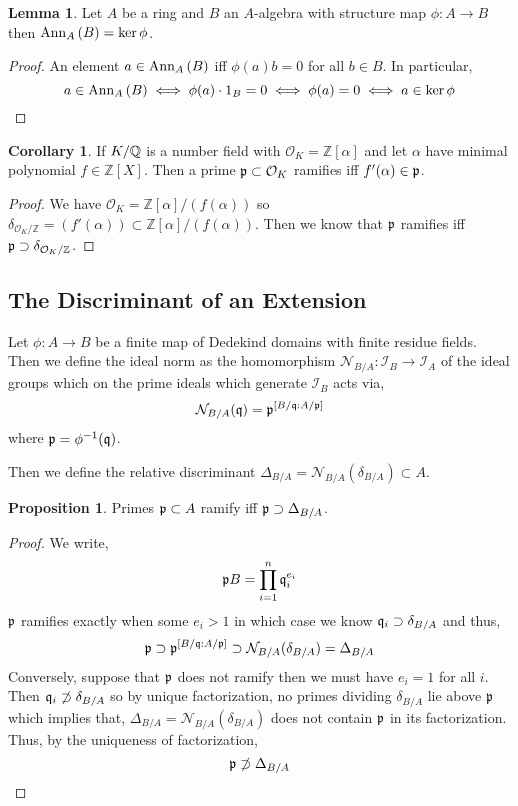 \documentclass[12pt]{extarticle}
\newcommand{\Z}{\mathbb{Z}}
\theoremstyle{definition}
\newtheorem{lemma}[theorem]{Lemma}
\newtheorem{proposition}[theorem]{Proposition}
\newtheorem{corollary}[theorem]{Corollary}
\newenvironment{definition}[1][Definition:]{\begin{trivlist}
\item[\hskip \labelsep {\bfseries #1}]}{\end{trivlist}}
\begin{document}
\begin{lemma}
Let $A$ be a ring and $B$ an $A$-algebra with structure map $\phi : A \to B$ then $\mathrm{Ann}_{A}\left( B \right) = \ker{\phi}$. 
\end{lemma}

\begin{proof}
An element $a \in \mathrm{Ann}_{A}\left( B \right)$ iff $\phi(a)b = 0$ for all $b \in B$. In particular,
\[ a \in \mathrm{Ann}_{A}\left( B \right) \iff \phi(a) \cdot 1_B = 0 \iff \phi(a) = 0 \iff a \in \ker{\phi} \]
\end{proof}
\newcommand{\ints}[1]{\mathcal{O}_{#1}}

\begin{corollary}
If $K / \mathbb{Q}$ is a number field with $\ints{K} = \Z[\alpha]$ and let $\alpha$ have minimal polynomial $f \in \Z[X]$. Then a prime $\p \subset \ints{K}$ ramifies iff $f'(\alpha) \in \mathfrak{p}$. 
\end{corollary}

\begin{proof}
We have $\ints{K} = \Z[\alpha]/(f(\alpha))$ so $\delta_{\ints{K}/\Z} = (f'(\alpha)) \subset \Z[\alpha]/(f(\alpha))$. Then we know that $\mathfrak{p}$ ramifies iff $\p \supset \delta_{\ints{K}/\Z}$. 
\end{proof}

\subsection{The Discriminant of an Extension}

\newcommand{\Norm}{\mathcal{N}}
\newcommand{\I}{\mathcal{I}}

\begin{definition}
Let $\phi : A \to B$ be a finite map of Dedekind domains with finite residue fields. Then we define the ideal norm as the homomorphism $\Norm_{B/A} : \I_{B} \to \I_{A}$ of the ideal groups which on the prime ideals which generate $\I_B$ acts via,
\[ \Norm_{B / A}(\q) = \p^{[B / \q : A / \p]} \]
where $\mathfrak{p} = \phi^{-1}(\mathfrak{q})$. 
\end{definition}


\begin{definition}
Then we define the relative discriminant $\Delta_{B/A} = \Norm_{B/A}(\delta_{B/A}) \subset A$.
\end{definition}

\begin{proposition}
Primes $\mathfrak{p} \subset A$ ramify iff $\mathfrak{p} \supset \Delta_{B / A}$. 
\end{proposition}

\begin{proof}
We write,
\[ \mathfrak{p} B = \prod_{i = 1}^n \mathfrak{q}_i^{e_i} \]
$\mathfrak{p}$ ramifies exactly when some $e_i > 1$ in which case we know $\mathfrak{q}_i \supset \delta_{B/A}$ and thus,
\[ \p \supset \p^{[B / \q : A / \p]} \supset \Norm_{B / A}(\delta_{B/A}) = \Delta_{B/A} \]
Conversely, suppose that $\mathfrak{p}$ does not ramify then we must have $e_i = 1$ for all $i$. Then $\mathfrak{q}_i \not\supset \delta_{B/A}$ so by unique factorization, no primes dividing $\delta_{B/A}$ lie above $\mathfrak{p}$ which implies that, $\Delta_{B/A} = \Norm_{B/A}(\delta_{B/A})$ does not contain $\mathfrak{p}$ in its factorization. Thus, by the uniqueness of factorization,
\[ \mathfrak{p} \not\supset \Delta_{B/A} \]
\end{proof}
\end{document}
